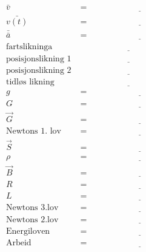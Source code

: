 \documentclass{article}
\begin{document}
\begin{align*}
    \bar{v} &= \underline{\hspace{5cm}} \\
    \bar{v(t)} &= \underline{\hspace{5cm}} \\    
    \bar{\bar{a}} &= \underline{\hspace{5cm}} \\
    \text{fartslikninga} & \underline{\hspace{5cm}} \\
    \text{posisjonslikning 1} & \underline{\hspace{5cm}} \\
    \text{posisjonslikning 2} & \underline{\hspace{5cm}} \\
    \text{tidløs likning} & \underline{\hspace{5cm}} \\
    g &= \underline{\hspace{5cm}} \\
    G &= \underline{\hspace{5cm}} \\
    \vec{G} &= \underline{\hspace{5cm}} \\
    \text{Newtons 1. lov} &= \underline{\hspace{5cm}} \\
    \vec{S} &= \underline{\hspace{5cm}} \\
    \rho &= \underline{\hspace{5cm}} \\
    \vec{B} &= \underline{\hspace{5cm}} \\
    R &= \underline{\hspace{5cm}} \\
    L &= \underline{\hspace{5cm}} \\
    \text{Newtons 3.lov} &= \underline{\hspace{5cm}} \\
    \text{Newtons 2.lov} &= \underline{\hspace{5cm}} \\
    \text{Energiloven} &= \underline{\hspace{5cm}} \\
    \text{Arbeid} &= \underline{\hspace{5cm}} \\

\end{align*}
\end{document}

